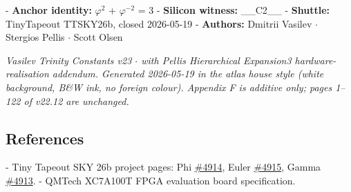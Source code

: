 - \textbf{Anchor identity:} $\varphi^{2}$ + $\varphi^{-2}$ = 3
- \textbf{Silicon witness:} \_\_C2\_\_
- \textbf{Shuttle:} TinyTapeout TTSKY26b, closed 2026-05-19
- \textbf{Authors:} Dmitrii Vasilev $\cdot$ Stergios Pellis $\cdot$ Scott Olsen

\textit{Vasilev Trinity Constants v23 $\cdot$ with Pellis Hierarchical Expansion3 hardware-realisation addendum. Generated 2026-05-19 in the atlas house style (white background, B\&W ink, no foreign colour). Appendix F is additive only; pages 1--122 of v22.12 are unchanged.}

\subsection{References}

- Tiny Tapeout SKY 26b project pages: Phi \href{https://app.tinytapeout.com/projects/4914}{\#4914}, Euler \href{https://app.tinytapeout.com/projects/4915}{\#4915}, Gamma \href{https://app.tinytapeout.com/projects/4913}{\#4913}.
- QMTech XC7A100T FPGA evaluation board specification.
